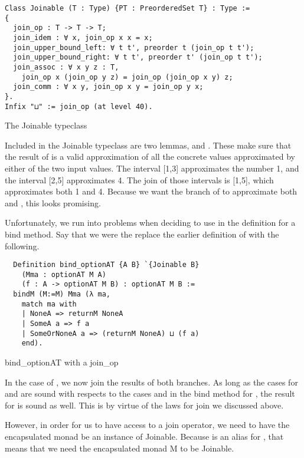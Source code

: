 \begin{listing}
\begin{verbatim}
Class Joinable (T : Type) {PT : PreorderedSet T} : Type :=
{
  join_op : T -> T -> T;
  join_idem : ∀ x, join_op x x = x;
  join_upper_bound_left: ∀ t t', preorder t (join_op t t');
  join_upper_bound_right: ∀ t t', preorder t' (join_op t t');
  join_assoc : ∀ x y z : T, 
    join_op x (join_op y z) = join_op (join_op x y) z;
  join_comm : ∀ x y, join_op x y = join_op y x;
}.
Infix "⊔" := join_op (at level 40).
\end{verbatim}
\caption{The Joinable typeclass}
\label{lst:joinable_typeclass}
\end{listing}

Included in the Joinable typeclass are two lemmas, 
 and . 
These make sure that the result of  is a valid approximation
of all the concrete values approximated by either of the two input values. 
The interval [1,3] approximates the number 1, and the interval [2,5]
approximates 4. The join of those intervals is [1,5], which approximates both 1
and 4. Because we want the branch of  to approximate both
 and , this looks promising.

Unfortunately, we run into problems when deciding to use  in the
definition for a bind method. Say that we were the replace the earlier
definition of  with the following.

\begin{listing}[H]
\begin{verbatim}
  Definition bind_optionAT {A B} `{Joinable B}
    (Mma : optionAT M A)
    (f : A -> optionAT M B) : optionAT M B :=
  bindM (M:=M) Mma (λ ma,
    match ma with
    | NoneA => returnM NoneA
    | SomeA a => f a
    | SomeOrNoneA a => (returnM NoneA) ⊔ (f a)
    end).
\end{verbatim}
\caption{bind\_optionAT with a join\_op}
\label{lst:bind_optionAT_join}
\end{listing}

In the case of , we now join the results of both branches. As long
as the cases for  and  are sound with respects to the 
cases  and  in the bind method for , 
the result for  is sound
as well. This is by virtue of the laws for join we discussed above.

However, in order for us to have access to a join operator, we need to have the
encapsulated monad be an instance of Joinable. Because  is 
an alias for , that means that we need the
encapsulated monad M to be Joinable. 

